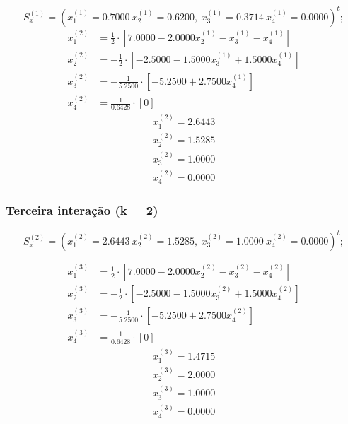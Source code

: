 \documentclass[12pt,a4paper]{article}
\begin{document}
                \[
                S_x^{(1)} = (x_1^{(1)} = 0.7000\ x_2^{(1)}= 0.6200,\ x_3^{(1)}= 0.3714\ x_4^{(1)}= 0.0000)^t;
                \]
                \begin{align*}
                    x_1^{(2)} &= \frac{1}{2} \cdot [7.0000 - 2.0000x_2^{(1)} - x_3^{(1)} - x_4^{(1)}]\\
                    x_2^{(2)} &= -\frac{1}{2} \cdot [-2.5000 - 1.5000x_3^{(1)} + 1.5000x_4^{(1)}]\\
                    x_3^{(2)} &= -\frac{1}{5.2500} \cdot [-5.2500 + 2.7500x_4^{(1)}]\\
                    x_4^{(2)} &= \frac{1}{0.6428} \cdot [0]
                \end{align*}
                \begin{align*}
                    x_1^{(2)} = 2.6443\\ x_2^{(2)}= 1.5285\\ x_3^{(2)}= 1.0000\\ x_4^{(2)}= 0.0000
                \end{align*}

            \subsubsection{Terceira interação (k = 2)}

                \[
                S_x^{(2)} = (x_1^{(2)} = 2.6443\ x_2^{(2)}= 1.5285,\ x_3^{(2)}= 1.0000\ x_4^{(2)}= 0.0000)^t;
                \]

                \begin{align*}
                    x_1^{(3)} &= \frac{1}{2} \cdot [7.0000 - 2.0000x_2^{(2)} - x_3^{(2)} - x_4^{(2)}]\\
                    x_2^{(3)} &= -\frac{1}{2} \cdot [-2.5000 - 1.5000x_3^{(2)} + 1.5000x_4^{(2)}]\\
                    x_3^{(3)} &= -\frac{1}{5.2500} \cdot [-5.2500 + 2.7500x_4^{(2)}]\\
                    x_4^{(3)} &= \frac{1}{0.6428} \cdot [0]
                \end{align*}
                \begin{align*}
                    x_1^{(3)} = 1.4715\\ x_2^{(3)}= 2.0000\\ x_3^{(3)}= 1.0000\\ x_4^{(3)}= 0.0000
                \end{align*}
\end{document}
